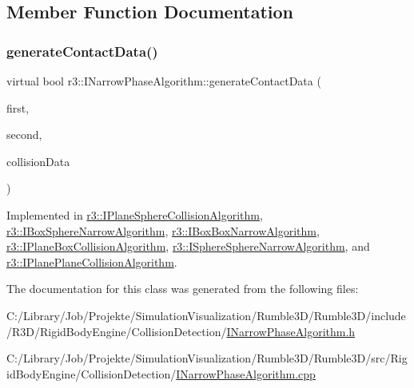 \subsection{Member Function Documentation}
\mbox{\label{classr3_1_1_i_narrow_phase_algorithm_a606fe8de5fe81ff45fedb81ca74717c3}} 
\subsubsection{\texorpdfstring{generate\+Contact\+Data()}{generateContactData()}}
{\footnotesize\ttfamily virtual bool r3\+::\+I\+Narrow\+Phase\+Algorithm\+::generate\+Contact\+Data (\begin{DoxyParamCaption}\item[{\mbox{\hyperlink{classr3_1_1_rigid_body}{Rigid\+Body}} $\ast$}]{first,  }\item[{\mbox{\hyperlink{classr3_1_1_rigid_body}{Rigid\+Body}} $\ast$}]{second,  }\item[{\mbox{\hyperlink{classr3_1_1_collision_data}{Collision\+Data}} \&}]{collision\+Data }\end{DoxyParamCaption})\hspace{0.3cm}{\ttfamily [pure virtual]}}



Implemented in \mbox{\hyperlink{classr3_1_1_i_plane_sphere_collision_algorithm_a5b1c334d90d381e089d59cb59a7714c5}{r3\+::\+I\+Plane\+Sphere\+Collision\+Algorithm}}, \mbox{\hyperlink{classr3_1_1_i_box_sphere_narrow_algorithm_aeecdb2486c6e6cbae057466f05323bdb}{r3\+::\+I\+Box\+Sphere\+Narrow\+Algorithm}}, \mbox{\hyperlink{classr3_1_1_i_box_box_narrow_algorithm_a4b06ee2be38c248c59195082db64c3e3}{r3\+::\+I\+Box\+Box\+Narrow\+Algorithm}}, \mbox{\hyperlink{classr3_1_1_i_plane_box_collision_algorithm_aacbbfc59a3cb174876bd5cffad22f1fc}{r3\+::\+I\+Plane\+Box\+Collision\+Algorithm}}, \mbox{\hyperlink{classr3_1_1_i_sphere_sphere_narrow_algorithm_acfdb8ae3db8c91843216651768cbd4e2}{r3\+::\+I\+Sphere\+Sphere\+Narrow\+Algorithm}}, and \mbox{\hyperlink{classr3_1_1_i_plane_plane_collision_algorithm_a910587be6f6537f86bbcc5e3a9b40223}{r3\+::\+I\+Plane\+Plane\+Collision\+Algorithm}}.



The documentation for this class was generated from the following files\+:\begin{DoxyCompactItemize}
\item 
C\+:/\+Library/\+Job/\+Projekte/\+Simulation\+Visualization/\+Rumble3\+D/\+Rumble3\+D/include/\+R3\+D/\+Rigid\+Body\+Engine/\+Collision\+Detection/\mbox{\hyperlink{_i_narrow_phase_algorithm_8h}{I\+Narrow\+Phase\+Algorithm.\+h}}\item 
C\+:/\+Library/\+Job/\+Projekte/\+Simulation\+Visualization/\+Rumble3\+D/\+Rumble3\+D/src/\+Rigid\+Body\+Engine/\+Collision\+Detection/\mbox{\hyperlink{_i_narrow_phase_algorithm_8cpp}{I\+Narrow\+Phase\+Algorithm.\+cpp}}\end{DoxyCompactItemize}

